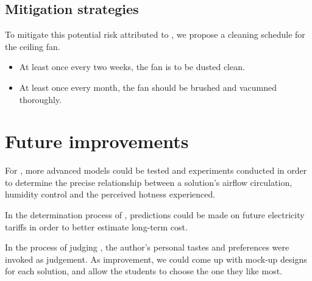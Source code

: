 \documentclass[british,a4paper,]{article}
\theoremstyle{definition}
\begin{document}
\subsection{Mitigation strategies}

To mitigate this potential risk attributed to ,
we propose a cleaning schedule for the ceiling fan.\autocite{howtoclean}
\begin{itemize}
    \item At least once every two weeks, the fan is to be dusted clean.
    \item At least once every month, the fan should be brushed and vacumned thoroughly.
\end{itemize}

\section{Future improvements}

For , more advanced models could be tested and experiments conducted in order to determine the precise relationship between a solution's airflow circulation, humidity control and the perceived hotness experienced.

In the determination process of , predictions could be made on future electricity tariffs in order to better estimate long-term cost.

In the process of judging , the author's personal tastes and preferences were invoked as judgement.
As improvement, we could come up with mock-up designs for each solution,
and allow the students to choose the one they like most.


\printbibliography
\end{document}
